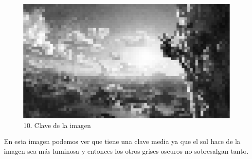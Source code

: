 \documentclass[12pt]{article}
\begin{document}
        \begin{figure}[H]
          \centering
          \includegraphics[scale=0.35]{images/Selena/10 pixelada.png}
          \caption{\small 10. Clave de la imagen}
        \end{figure}
        En esta imagen podemos ver que tiene una clave media ya que el sol hace de la imagen sea más luminosa y entonces los otros grises oscuros no sobresalgan tanto.
\end{document}
